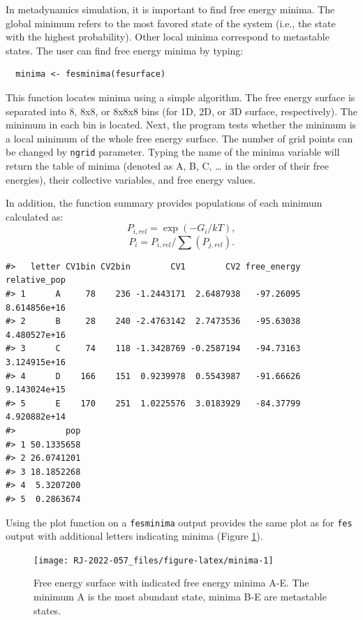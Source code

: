 In metadynamics simulation, it is important to find free energy minima. The global minimum
refers to the most favored state of the system (i.e., the state with the highest probability).
Other local minima correspond to metastable states. The user can find free energy
minima by typing:

\begin{verbatim}
  minima <- fesminima(fesurface)
\end{verbatim}

This function locates minima using a simple algorithm. The free energy surface is separated into
8, 8x8, or 8x8x8 bins (for 1D, 2D, or 3D surface, respectively). The minimum in each bin is
located. Next, the program tests whether the minimum is a local minimum of the whole free
energy surface. The number of grid points can be changed by \texttt{ngrid} parameter.
Typing the name of the minima variable will return the table of minima (denoted as
A, B, C, \ldots{} in the order of their free energies), their collective variables, and free
energy values.

In addition, the function summary provides populations of each
minimum calculated as:
\begin{equation}
P_{i,rel} = \exp(-G_i/kT),
\end{equation}
\begin{equation}
P_i = P_{i,rel} / \sum (P_{j,rel}).
\end{equation}

\begin{verbatim}
#>   letter CV1bin CV2bin        CV1        CV2 free_energy relative_pop
#> 1      A     78    236 -1.2443171  2.6487938   -97.26095 8.614856e+16
#> 2      B     28    240 -2.4763142  2.7473536   -95.63038 4.480527e+16
#> 3      C     74    118 -1.3428769 -0.2587194   -94.73163 3.124915e+16
#> 4      D    166    151  0.9239978  0.5543987   -91.66626 9.143024e+15
#> 5      E    170    251  1.0225576  3.0183929   -84.37799 4.920882e+14
#>          pop
#> 1 50.1335658
#> 2 26.0741201
#> 3 18.1852268
#> 4  5.3207200
#> 5  0.2863674
\end{verbatim}

Using the plot function on a \texttt{fesminima} output provides the same plot as for \texttt{fes} output
with additional letters indicating minima (Figure \ref{fig:minima}).

\begin{figure}

{\centering \texttt{[image: RJ-2022-057\_files/figure-latex/minima-1]} 

}

\caption{Free energy surface with indicated free energy minima A-E. The minimum A is the most abundant state, minima B-E are metastable states.}\label{fig:minima}
\end{figure}

